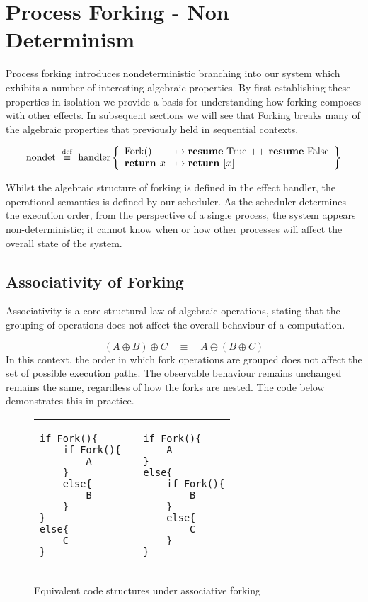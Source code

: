 \documentclass[logo,bsc,singlespacing,parskip]{infthesis}
\begin{document}
\section{Process Forking - Non Determinism}
Process forking introduces nondeterministic branching into our system which exhibits a number of interesting algebraic properties. By first establishing these properties in isolation we provide a basis for understanding how forking composes with other effects. In subsequent sections we will see that Forking breaks many of the algebraic properties that previously held in sequential contexts.


\[
\text{nondet} \ \overset{\text{def}}{\equiv} \ \text{handler} \left\{
\begin{array}{ll}
\text{Fork}() &\mapsto \text{\textbf{resume} True ++ \textbf{resume} False} \\

\textbf{return } x &\mapsto \textbf{return } [x]
\end{array}
\right\}
\]

Whilst the algebraic structure of forking is defined in the effect handler, the operational semantics is defined by our scheduler. As the scheduler determines the execution order, from the perspective of a single process, the system appears non-deterministic; it cannot know when or how other processes will affect the overall state of the system.

\subsection*{Associativity of Forking}
Associativity is a core structural law of algebraic operations, stating that the grouping of operations does not affect the overall behaviour of a computation.

\[
(A \oplus B) \oplus C \quad \equiv \quad A \oplus (B \oplus C)
\]
In this context, the order in which fork operations are grouped does not affect the set of possible execution paths. The observable behaviour remains unchanged remains the same, regardless of how the forks are nested. The code below demonstrates this in practice.


\begin{figure}[H]
    \centering


\begin{table}[H]
\centering
\begin{tabular}{p{} c p{}}
\begin{lstlisting}
if Fork(){
    if Fork(){
        A
    }
    else{
        B
    }
}
else{
    C
}
\end{lstlisting}
&
&
\begin{lstlisting}
if Fork(){
    A
} 
else{
    if Fork(){
        B
    }
    else{
        C
    }
}
\end{lstlisting}
\end{tabular}
\end{table}
\vspace{-2em}

    \caption{Equivalent code structures under associative forking}
    \label{fig:enter-label}
\end{figure}
\end{document}
